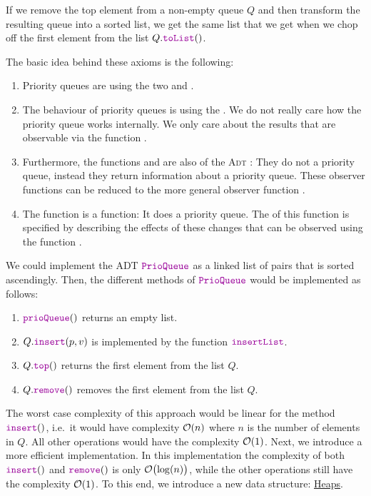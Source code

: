 \begin{Definition}
\begin{enumerate}
\begin{enumerate}
            If we remove the top element from a non-empty queue $Q$ and then transform the resulting queue into
            a sorted list, we get the same list that we get when we chop off the first element from the list
            $Q.\mytt{toList}()$.
      \end{enumerate}
      The basic idea behind these axioms is the following:  
      \begin{enumerate}
      \item Priority queues are  using the two   and
            .
      \item The behaviour of priority queues is  using the 
            .  We do not really care how the priority queue works internally.  We only care
            about the results that are observable via the function .  
      \item Furthermore, the functions  and  are also  of the
            \textsc{Adt} :  They do not  a priority queue, instead they return
            information about a priority queue.  These observer functions can be reduced to the more general
            observer function . 
      \item The function  is a  function: It does
             a priority queue. 
            The  of this function is specified by describing the effects of these
            changes that can be observed using the function . 
      \end{enumerate}
\end{enumerate}
\end{Definition}
We could implement the ADT $\mytt{PrioQueue}$ as a linked list of pairs that is sorted ascendingly.
Then, the different methods of $\mytt{PrioQueue}$ would be implemented as follows:
\begin{enumerate}
\item $\mytt{prioQueue}()$ returns an empty list.
\item $Q.\mytt{insert}(p,v)$ is implemented by the function $\mytt{insertList}$. 
\item $Q.\mytt{top}()$ returns the first element from the list $Q$.
\item $Q.\mytt{remove}()$ removes the first element from the list $Q$.
\end{enumerate}
The worst case complexity of this approach would be linear for the method $\mytt{insert}()$,
i.e.~it would have complexity $\mathcal{O}(n)$ where $n$ is the number of elements in $Q$. 
All other operations would have the complexity $\mathcal{O}(1)$.  
Next, we introduce a more efficient implementation.  In this implementation the complexity of both $\mytt{insert}()$ and $\mytt{remove}()$
is only $\mathcal{O}\bigl(\log(n)\bigr)$, while the other operations still have the complexity $\mathcal{O}(1)$.
To this end, we introduce a new data structure: \href{https://en.wikipedia.org/wiki/Heap_(data_structure)}{Heaps}. 

